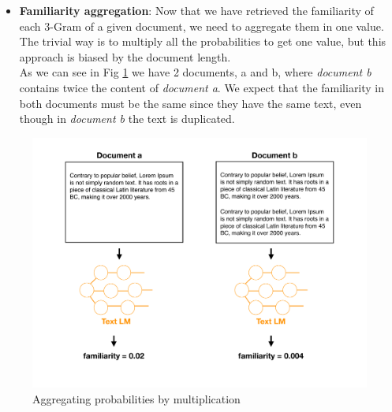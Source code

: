 \documentclass[12pt,mscthesis]{usiinfthesis}
\begin{document}
\begin{itemize}
	
		\item \textbf{Familiarity aggregation}: Now that we have retrieved the familiarity of each 3-Gram of a given document, we need to aggregate them in one value. The trivial way is to multiply all the probabilities to get one value, but this approach is biased by the document length.\\
		As we can see in Fig \ref{aggregation-by-multiplication} we have 2 documents, a and b, where \emph{document b} contains twice the content of \emph{document a}. We expect that the familiarity in both documents must be the same since they have the same text, even though in \emph{document b} the text is duplicated.\\ 
			\end{itemize}
		\begin{figure}[H]
			\centering
			\includegraphics[width=\textwidth]{aggregation-by-multiplication}
			\caption{Aggregating probabilities by multiplication}
			\label{aggregation-by-multiplication}
			\end{figure}
\end{document}
